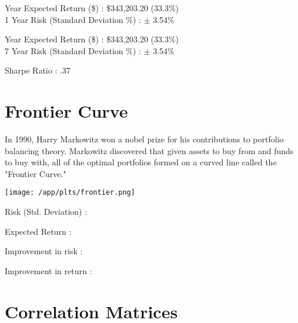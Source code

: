 \documentclass{article}
\begin{document}
 Year Expected Return (\$) : \$343,203.20 (33.3\%)\\
1 Year Risk (Standard Deviation \%) : $\pm$ 3.54\%

 Year Expected Return (\$) : \$343,203.20 (33.3\%)\\
7 Year Risk (Standard Deviation \%) : $\pm$ 3.54\%

\noindent
Sharpe Ratio : .37


\newpage



\section{Frontier Curve}

In 1990, Harry Markowitz won a nobel prize for his contributions to portfolio balancing theory. Markowitz discovered that given assets to buy from and funds to buy with, all of the optimal portfolios formed on a curved line called the "Frontier Curve."

\vspace{2cm}

\hspace*{-1cm}\texttt{[image: /app/plts/frontier.png]}\par

\vspace{1cm}


Risk (Std. Deviation) : {}

Expected Return : {}

Improvement in risk : {}

Improvement in return : {}


\newpage

\section{Correlation Matrices}

\vspace{1cm}
\end{document}
